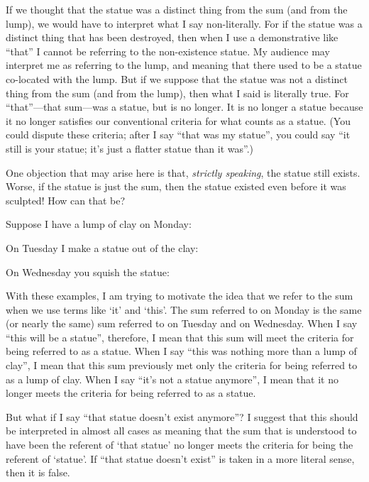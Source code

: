 \documentclass[11pt]{article}
\begin{document}
\begin{spacing}{1.5}

If we thought that the statue was a distinct thing from the sum (and
from the lump), we would have to interpret what I say non-literally.
For if the statue was a distinct thing that has been destroyed, then
when I use a demonstrative like ``that'' I cannot be referring to the
non-existence statue.  My audience may interpret me as referring to
the lump, and meaning that there used to be a statue co-located with
the lump.  But if we suppose that the statue was not a distinct thing
from the sum (and from the lump), then what I said is literally true.
For ``that''---that sum---was a statue, but is no longer.  It is no
longer a statue because it no longer satisfies our conventional
criteria for what counts as a statue.  (You could dispute these
criteria; after I say ``that was my statue'', you could say ``it still
is your statue; it's just a flatter statue than it was''.)

One objection that may arise here is that, {\em strictly speaking},
the statue still exists.  Worse, if the statue is just the sum, then
the statue existed even before it was sculpted!  How can that be?

Suppose I have a lump of clay on Monday:


On Tuesday I make a statue out of the clay:


On Wednesday you squish the statue:


With these examples, I am trying to motivate the idea that we refer to
the sum when we use terms like `it' and `this'.  The sum referred to
on Monday is the same (or nearly the same) sum referred to on Tuesday
and on Wednesday.  When I say ``this will be a statue'', therefore, I
mean that this sum will meet the criteria for being referred to as a
statue.  When I say ``this was nothing more than a lump of clay'', I
mean that this sum previously met only the criteria for being referred
to as a lump of clay.  When I say ``it's not a statue anymore'', I
mean that it no longer meets the criteria for being referred to as a
statue.

But what if I say ``that statue doesn't exist anymore''?  I suggest
that this should be interpreted in almost all cases as meaning that
the sum that is understood to have been the referent of `that statue'
no longer meets the criteria for being the referent of `statue'.  If
``that statue doesn't exist'' is taken in a more literal sense, then
it is false.


\end{spacing}
\end{document}
